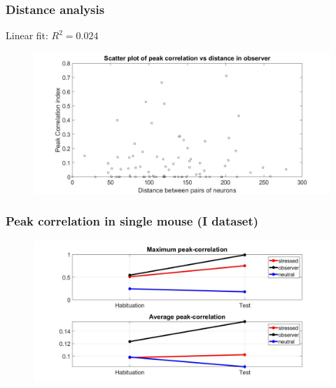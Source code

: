 \documentclass{beamer}
\begin{document}
\begin{frame}
\frametitle{Distance analysis}

Linear fit: $ R^2 = 0.024$ 

\begin{figure}[H]
	\begin{center}
		\hspace*{-1.3cm}
		\includegraphics[scale=.30]{distance.jpg} 
	\end{center}  
	
	
\end{figure}

\end{frame}

\begin{frame}
\frametitle{Peak correlation in single mouse (I dataset)}


\begin{figure}[H]
	\begin{center}
		\hspace*{-1.3cm}
		\includegraphics[scale=.30]{peak_corr.jpg} 
	\end{center}  
	
	
\end{figure}

\end{frame}
\end{document}
